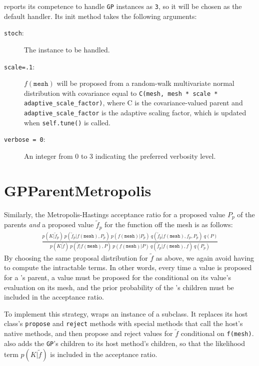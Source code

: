  reports its competence to handle \texttt{GP} instances as \texttt{3}, so it will be chosen as the default handler. Its init method takes the following arguments:
\begin{description}
    \item[\texttt{stoch}:] The  instance to be handled.
    \item[\texttt{scale=.1}:] $f(\texttt{mesh})$ will be proposed from a random-walk multivariate normal distribution with covariance equal to \texttt{C(mesh, mesh * scale * adaptive_scale_factor)}, where C is the covariance-valued parent and \texttt{adaptive_scale_factor} is the adaptive scaling factor, which is updated when \texttt{self.tune()} is called.
    \item[\texttt{verbose = 0}:] An integer from 0 to 3 indicating the preferred verbosity level.
\end{description}

\section{GPParentMetropolis}
Similarly, the Metropolis-Hastings acceptance ratio for a proposed value $P_p$ of the parents \emph{and} a proposed value $\tilde f_p$ for the function off the mesh is as follows:
\begin{eqnarray*}
    \frac{p(K|\tilde f_p)\ p(\tilde f_p|f(\texttt{mesh}), P_p)\ p(f(\texttt{mesh}) | P_p)\ q(\tilde f_p|f(\texttt{mesh}),f_p, P_p)\ q(P)}{p(K|\tilde f)\ p(\tilde f|f(\texttt{mesh}), P)\ p(f(\texttt{mesh}) | P)\ q(\tilde f_p|f(\texttt{mesh}),f)\ q(P_p)}
\end{eqnarray*}
By choosing the same proposal distribution for $\tilde f$ as above, we again avoid having to compute the intractable terms. In other words, every time a value is proposed for a 's parent, a value must be proposed for the   conditional on its value's evaluation on its mesh, and the prior probability of the 's children must be included in the acceptance ratio.

To implement this strategy,  wraps an instance of a  subclass. It replaces its host class's \texttt{propose} and \texttt{reject} methods with special methods that call the host's native methods, and then propose and reject values for $\tilde f$ conditional on \texttt{f(mesh)}.  also adds the \texttt{GP}'s children to its host method's children, so that the likelihood term $p(K|\tilde f)$ is included in the acceptance ratio.

